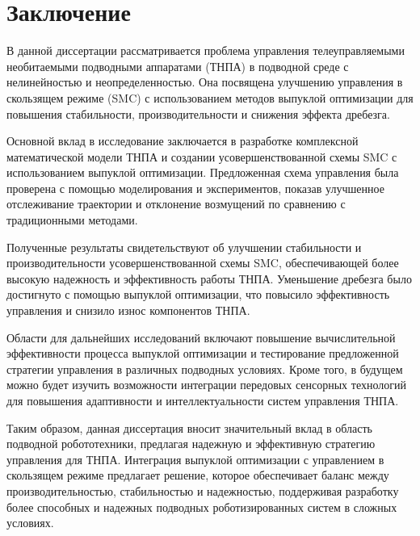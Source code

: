 \chapter{Заключение}
\label{chap:conclusion}

В данной диссертации рассматривается проблема управления телеуправляемыми необитаемыми подводными аппаратами (ТНПА) в подводной среде с нелинейностью и неопределенностью. Она посвящена улучшению управления в скользящем режиме (SMC) с использованием методов выпуклой оптимизации для повышения стабильности, производительности и снижения эффекта дребезга.

Основной вклад в исследование заключается в разработке комплексной математической модели ТНПА и создании усовершенствованной схемы SMC с использованием выпуклой оптимизации. Предложенная схема управления была проверена с помощью моделирования и экспериментов, показав улучшенное отслеживание траектории и отклонение возмущений по сравнению с традиционными методами.

Полученные результаты свидетельствуют об улучшении стабильности и производительности усовершенствованной схемы SMC, обеспечивающей более высокую надежность и эффективность работы ТНПА. Уменьшение дребезга было достигнуто с помощью выпуклой оптимизации, что повысило эффективность управления и снизило износ компонентов ТНПА.

Области для дальнейших исследований включают повышение вычислительной эффективности процесса выпуклой оптимизации и тестирование предложенной стратегии управления в различных подводных условиях. Кроме того, в будущем можно будет изучить возможности интеграции передовых сенсорных технологий для повышения адаптивности и интеллектуальности систем управления ТНПА.

Таким образом, данная диссертация вносит значительный вклад в область подводной робототехники, предлагая надежную и эффективную стратегию управления для ТНПА. Интеграция выпуклой оптимизации с управлением в скользящем режиме предлагает решение, которое обеспечивает баланс между производительностью, стабильностью и надежностью, поддерживая разработку более способных и надежных подводных роботизированных систем в сложных условиях.


